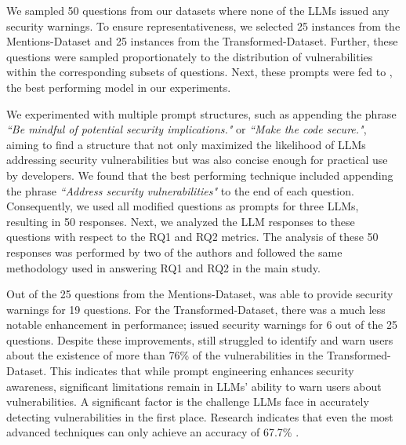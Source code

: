 We sampled 50 questions from our datasets where none of the LLMs issued any security warnings. To ensure representativeness, we selected 25 instances from the Mentions-Dataset and 25 instances from the Transformed-Dataset. Further, these questions were sampled proportionately to the distribution of vulnerabilities within the corresponding subsets of questions. Next, these prompts were fed to \gpt, the best performing model in our experiments.

We experimented with multiple prompt structures, such as appending the phrase \textit{``Be mindful of potential security implications."} or \textit{``Make the code secure."}, aiming to find a structure that not only maximized the likelihood of LLMs addressing security vulnerabilities but was also concise enough for practical use by developers. We found that the best performing technique included appending the phrase \textit{``Address security vulnerabilities"} to the end of each question. Consequently, we used all modified questions as prompts for three LLMs, resulting in 50 responses. Next, we analyzed the LLM responses to these questions with respect to the RQ1 and RQ2 metrics. The analysis of these 50 responses was performed by two of the authors and followed the same methodology used in answering RQ1 and RQ2 in the main study.

Out of the 25 questions from the Mentions-Dataset, \gpt was able to provide security warnings for 19 questions. For the Transformed-Dataset, there was a much less notable enhancement in performance; \gpt issued security warnings for 6 out of the 25 questions. Despite these improvements, \gpt still struggled to identify and warn users about the existence of more than 76\% of the vulnerabilities in the Transformed-Dataset. This indicates that while prompt engineering enhances security awareness, significant limitations remain in LLMs' ability to warn users about vulnerabilities. A significant factor is the challenge LLMs face in accurately detecting vulnerabilities in the first place. Research indicates that even the most advanced  techniques can only achieve an accuracy of 67.7\% \citep{zhou2024large, zhou2024out}.

